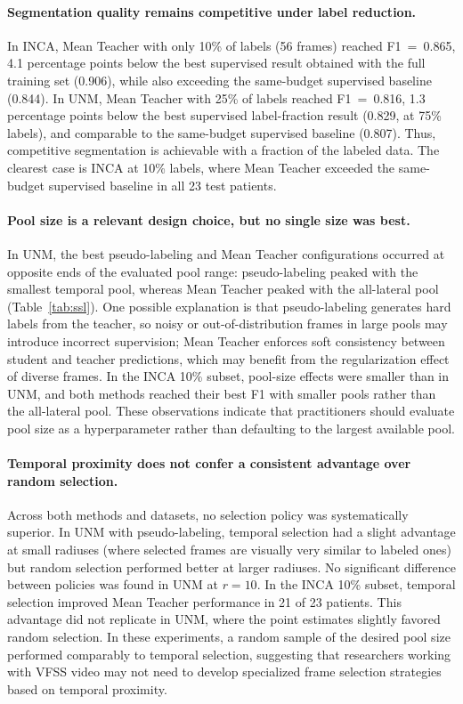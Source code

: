 \documentclass[a4paper,fleqn]{cas-dc}
\begin{document}
\paragraph{Segmentation quality remains competitive under label reduction.}
In INCA, Mean Teacher with only 10\% of labels (56 frames) reached F1~=~0.865, 4.1 percentage points below the best supervised result obtained with the full training set (0.906), while also exceeding the same-budget supervised baseline (0.844).
In UNM, Mean Teacher with 25\% of labels reached F1~=~0.816, 1.3 percentage points below the best supervised label-fraction result (0.829, at 75\% labels), and comparable to the same-budget supervised baseline (0.807).
Thus, competitive segmentation is achievable with a fraction of the labeled data. The clearest case is INCA at 10\% labels, where Mean Teacher exceeded the same-budget supervised baseline in all 23 test patients.

\paragraph{Pool size is a relevant design choice, but no single size was best.}
In UNM, the best pseudo-labeling and Mean Teacher configurations occurred at opposite ends of the evaluated pool range: pseudo-labeling peaked with the smallest temporal pool, whereas Mean Teacher peaked with the all-lateral pool (Table~\ref{tab:ssl}).
One possible explanation is that pseudo-labeling generates hard labels from the teacher, so noisy or out-of-distribution frames in large pools may introduce incorrect supervision; Mean Teacher enforces soft consistency between student and teacher predictions, which may benefit from the regularization effect of diverse frames.
In the INCA 10\% subset, pool-size effects were smaller than in UNM, and both methods reached their best F1 with smaller pools rather than the all-lateral pool.
These observations indicate that practitioners should evaluate pool size as a hyperparameter rather than defaulting to the largest available pool.

\paragraph{Temporal proximity does not confer a consistent advantage over random selection.}
Across both methods and datasets, no selection policy was systematically superior.
In UNM with pseudo-labeling, temporal selection had a slight advantage at small radiuses (where selected frames are visually very similar to labeled ones) but random selection performed better at larger radiuses.
No significant difference between policies was found in UNM at $r{=}10$.
In the INCA 10\% subset, temporal selection improved Mean Teacher performance in 21 of 23 patients. This advantage did not replicate in UNM, where the point estimates slightly favored random selection.
In these experiments, a random sample of the desired pool size performed comparably to temporal selection, suggesting that researchers working with VFSS video may not need to develop specialized frame selection strategies based on temporal proximity.
\end{document}
